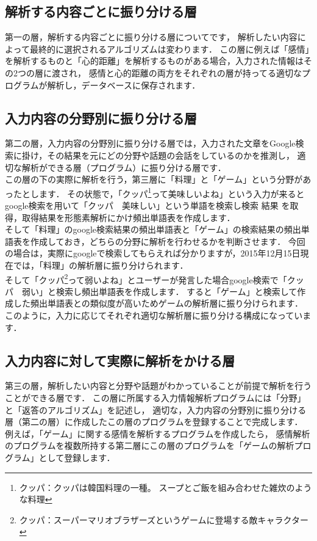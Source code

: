 \subsection{解析する内容ごとに振り分ける層}
第一の層，解析する内容ごとに振り分ける層についてです，
解析したい内容によって最終的に選択されるアルゴリズムは変わります．
この層に例えば「感情」を解析するものと「心的距離」を解析するものがある場合，入力された情報はその2つの層に渡され，
感情と心的距離の両方をそれぞれの層が持ってる適切なプログラムが解析し，データベースに保存されます．
\subsection{入力内容の分野別に振り分ける層}
第二の層，入力内容の分野別に振り分ける層では，入力された文章をGoogle検索に掛け，その結果を元にどの分野や話題の会話をしているのかを推測し，
適切な解析ができる層（プログラム）に振り分ける層です．\\

この層の下の実際に解析を行う，第三層に「料理」と「ゲーム」という分野があったとします．
その状態で，「クッパ\footnote{クッパ：クッパは韓国料理の一種。 スープとご飯を組み合わせた雑炊のような料理}って美味しいよね」という入力が来るとgoogle検索を用いて「クッパ　美味しい」という単語を検索し検索
結果
を取得，取得結果を形態素解析にかけ頻出単語表を作成します．
\\
そして「料理」のgoogle検索結果の頻出単語表と「ゲーム」の検索結果の頻出単語表を作成しておき，どちらの分野に解析を行わせるかを判断させます．
今回の場合は，実際にgoogleで検索してもらえれば分かりますが，2015年12月15日現在では，「料理」の解析層に振り分けられます．
\\
そして「クッパ\footnote{クッパ：スーパーマリオブラザーズというゲームに登場する敵キャラクター}って弱いよね」とユーザーが発言した場合google検索で「クッパ　弱い」と検索し頻出単語表を作成します．
すると「ゲーム」と検索して作成した頻出単語表との類似度が高いためゲームの解析層に振り分けられます．
\\
このように，入力に応じてそれぞれ適切な解析層に振り分ける構成になっています．
\subsection{入力内容に対して実際に解析をかける層}
第三の層，解析したい内容と分野や話題がわかっていることが前提で解析を行うことができる層です．
この層に所属する入力情報解析プログラムには「分野」と「返答のアルゴリズム」を記述し，
適切な，入力内容の分野別に振り分ける層（第二の層）に作成したこの層のプログラムを登録することで完成します．
例えば，「ゲーム」に関する感情を解析するプログラムを作成したら，
感情解析のプログラムを複数所持する第二層にこの層のプログラムを「ゲームの解析プログラム」として登録します．

